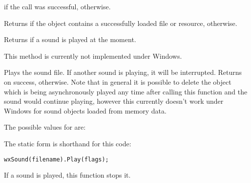 
\true if the call was successful, \false otherwise.


\label{wxsoundisok}


Returns \true if the object contains a successfully loaded file or resource, \false otherwise.


\label{wxsoundisplaying}


Returns \true if a sound is played at the moment.

This method is currently not implemented under Windows.


\label{wxsoundplay}



Plays the sound file. If another sound is playing, it will be interrupted.
Returns \true on success, \false otherwise. Note that in general it is possible
to delete the object which is being asynchronously played any time after
calling this function and the sound would continue playing, however this
currently doesn't work under Windows for sound objects loaded from memory data.

The possible values for  are:

\begin{twocollist}
\end{twocollist}

The static form is shorthand for this code:

\begin{verbatim}
wxSound(filename).Play(flags);
\end{verbatim}


\label{wxsoundstop}


If a sound is played, this function stops it.

